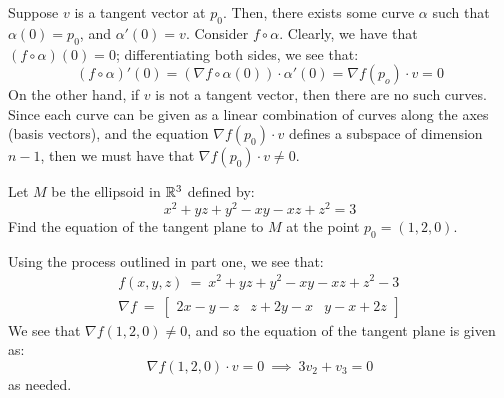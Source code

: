 \begin{soln}
    Suppose $ v $ is a tangent vector at $ p_{0} $. Then, there exists some curve
    $ \alpha $ such that $ \alpha(0) = p_{0} $, and $ \alpha'(0)=v $. Consider
    $ f\circ\alpha $. Clearly, we have that $ (f\circ\alpha)(0)=0 $;
    differentiating both sides, we see that:
    \begin{equation*}
        (f\circ\alpha)'(0)=(\nabla f\circ\alpha(0))\cdot\alpha'(0)=
        \nabla f(p_{o})\cdot v=0
    \end{equation*}
    On the other hand, if $ v $ is not a tangent vector, then there are no such
    curves. Since each curve can be given as a linear combination of curves along
    the axes (basis vectors), and the equation $ \nabla f(p_{0})\cdot v $ defines
    a subspace of dimension $ n-1 $, then we must have that $ \nabla f(p_{0})
    \cdot v \neq 0 $.
\end{soln}

\newpage
\begin{qu}[num=32.2]
    Let $ M $ be the ellipsoid in $ \mathbb{R}^{3} $ defined by:
    \begin{equation*}
        x^{2} + yz + y^{2} - xy - xz + z^{2} = 3
    \end{equation*}
    Find the equation of the tangent plane to $ M $ at the point
    $ p_{0} = (1, 2, 0) $.
\end{qu}

\begin{soln}
    Using the process outlined in part one, we see that:
    \begin{gather*}
        f(x,y,z) \ = \ x^{2}+yz+y^{2}-xy-xz+z^{2}-3 \\
        \nabla f \ = \
        \begin{bmatrix}
            2x-y-z & z+2y-x & y-x+2z
        \end{bmatrix}
    \end{gather*}
    We see that $ \nabla f(1,2,0) \neq 0 $, and so the equation of the tangent
    plane is given as:
    \begin{equation*}
        \nabla f(1,2,0)\cdot v = 0 \ \implies \ 3v_{2}+v_{3} = 0
    \end{equation*}
    as needed.
\end{soln}


